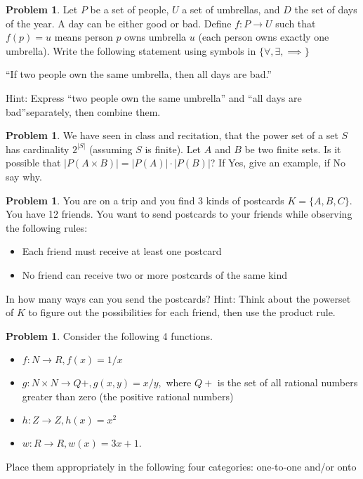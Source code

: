 \documentclass[10pt,leqno ]{article}
\theoremstyle{definition}
\newtheorem{problem}[theorem]{Problem}
\begin{document}
\begin{problem} Let $P$ be a set of people, $U$ a set of umbrellas, and $D$ the set of days of the year.  A day can be either good or bad.  Define $f:P \to U$ such that $f(p) =u$ means person $p$ owns umbrella $u$ (each person owns exactly one umbrella).  Write the following statement using symbols in $\{\forall,\exists,\implies\}$
\begin{center}
“If two people own the same umbrella, then all days are bad.”
\end{center}
Hint: Express “two people own the same umbrella” and “all days are bad”separately, then combine them.
\Large
\end{problem}
\newpage

\begin{problem} We have seen in class and recitation, that the power set of a set $S$ has cardinality $2^{|S|}$ (assuming $S$ is finite).  Let $A$ and $B$ be two finite sets.  Is it possible that $|P(A \times B)|=|P(A)|\cdot|P(B)|$?  If Yes, give an example, if No say why.
\\
\Large

\end{problem}
\newpage

\begin{problem} You are on a trip and you find 3 kinds of postcards $K=\{A, B, C\}$.  You have 12 friends.  You want to send postcards to your friends while observing the following rules:
\begin{itemize}
\item Each friend must receive at least one postcard\\
\item No friend can receive two or more postcards of the same kind
\end{itemize}
In how many ways can you send the postcards?  Hint:  Think about the powerset of $K$ to figure out the possibilities for each friend, then use the product rule.
\Large

\end{problem}
\newpage

\begin{problem} Consider the following 4 functions.
\begin{itemize}
\item $f:N \to R ,f(x) = 1/x$\\
\item $g:N \times N \to Q+,g(x, y) =x/y,$ where $Q+$ is the set of all rational numbers greater than zero (the positive rational numbers)\\
\item $h:Z \to Z ,h(x) = x^2$\\
\item $w:R \to R, w(x) = 3x+ 1$.
\end{itemize}
Place them appropriately in the following four categories:  one-to-one and/or onto
\\
\Large

\end{problem}
\end{document}
